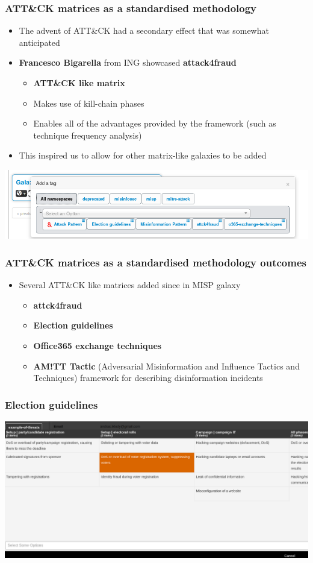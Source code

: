 \begin{frame}
  \frametitle{ATT\&CK matrices as a standardised methodology}
  \begin{itemize}
    \item The advent of ATT\&CK had a secondary effect that was somewhat anticipated
    \item {\bf Francesco Bigarella} from ING showcased {\bf attack4fraud}
    \begin{itemize}
      \item {\bf ATT\&CK like matrix}
      \item Makes use of kill-chain phases
      \item Enables all of the advantages provided by the framework (such as technique frequency analysis)
    \end{itemize}
    \item This inspired us to allow for other matrix-like galaxies to be added
  \end{itemize}
        \includegraphics[scale=0.3]{matrix-like.png}
\end{frame}


\begin{frame}
  \frametitle{ATT\&CK matrices as a standardised methodology outcomes}
  \begin{itemize}
    \item Several ATT\&CK like matrices added since in MISP galaxy
    \begin{itemize}
      \item {\bf attck4fraud}
      \item {\bf Election guidelines}
      \item {\bf Office365 exchange techniques}
      \item {\bf AM!TT Tactic} (Adversarial Misinformation and Influence Tactics and Techniques) framework for describing disinformation incidents
    \end{itemize}
  \end{itemize}
\end{frame}

\begin{frame}
  \frametitle{Election guidelines}
  \includegraphics[scale=0.3]{election.png}
\end{frame}

